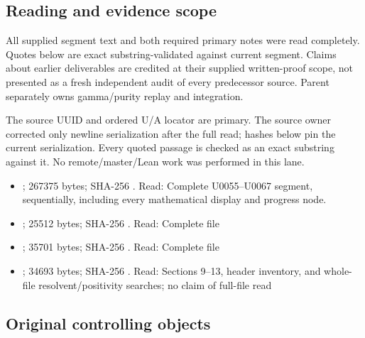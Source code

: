 \subsection{Reading and evidence
scope}\label{TranscriptLedgerStage:reading-and-evidence-scope}

All supplied segment text and both required primary notes were read
completely. Quotes below are exact substring-validated against current
segment. Claims about earlier deliverables are credited at their
supplied written-proof scope, not presented as a fresh independent audit
of every predecessor source. Parent separately owns gamma/purity replay
and integration.

The source UUID and ordered U/A locator are primary. The source owner
corrected only newline serialization after the full read; hashes below
pin the current serialization. Every quoted passage is checked as an
exact substring against it. No remote/master/Lean work was performed in
this lane.

\begin{itemize}
\tightlist
\item
  \protect{};
  267375 bytes; SHA-256
  \protect{}.
  Read: Complete U0055--U0067 segment, sequentially, including every
  mathematical display and progress node.
\item
  \protect{};
  25512 bytes; SHA-256
  \protect{}.
  Read: Complete file
\item
  \protect{};
  35701 bytes; SHA-256
  \protect{}.
  Read: Complete file
\item
  \protect{};
  34693 bytes; SHA-256
  \protect{}.
  Read: Sections 9--13, header inventory, and whole-file
  resolvent/positivity searches; no claim of full-file read
\end{itemize}

\subsection{Original controlling
objects}\label{TranscriptLedgerStage:original-controlling-objects}

